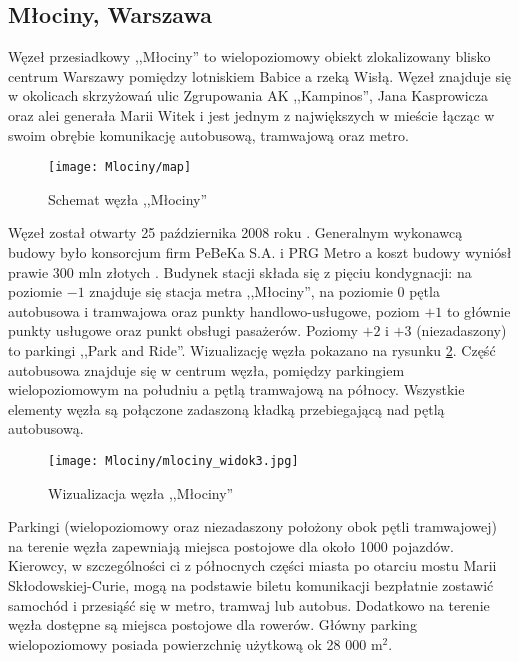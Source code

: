 \documentclass[twoside,12pt]{article}
\begin{document}
	\subsection{Młociny, Warszawa}
	
	Węzeł przesiadkowy ,,Młociny'' to wielopoziomowy obiekt zlokalizowany blisko centrum Warszawy pomiędzy lotniskiem Babice a rzeką Wisłą. Węzeł znajduje się w okolicach skrzyżowań ulic Zgrupowania AK ,,Kampinos'', Jana Kasprowicza oraz alei generała Marii Witek i jest jednym z największych w mieście łącząc w swoim obrębie komunikację autobusową, tramwajową oraz metro. 
	
	\begin{figure}[H]
		\centering
		\texttt{[image: Mlociny/map]}\\
		\caption{Schemat węzła ,,Młociny''}
		\label{mlociny1}
	\end{figure}	
	
	Węzeł został otwarty 25 października 2008 roku \cite{mlociny1}. Generalnym wykonawcą budowy było konsorcjum firm PeBeKa S.A. i PRG Metro a koszt budowy wyniósł prawie 300 mln złotych \cite{mlociny3}. Budynek stacji składa się z pięciu kondygnacji: na poziomie $-1$ znajduje się stacja metra ,,Młociny'', na poziomie $0$ pętla autobusowa i tramwajowa oraz punkty handlowo-usługowe, poziom $+1$ to głównie punkty usługowe oraz punkt obsługi pasażerów. Poziomy $+2$ i $+3$ (niezadaszony) to parkingi ,,Park and Ride''. Wizualizację węzła pokazano na rysunku \ref{mlociny2}. Część autobusowa znajduje się w centrum węzła, pomiędzy parkingiem wielopoziomowym na południu a pętlą tramwajową na północy. Wszystkie elementy węzła są połączone zadaszoną kładką przebiegającą nad pętlą autobusową.
	
	\begin{figure}[H]
		\centering
		\texttt{[image: Mlociny/mlociny\_widok3.jpg]}\\
		\caption{Wizualizacja węzła ,,Młociny''}
		\label{mlociny2}
	\end{figure}	
	
	Parkingi (wielopoziomowy oraz niezadaszony położony obok pętli tramwajowej) na terenie węzła zapewniają miejsca postojowe dla około 1000 pojazdów. Kierowcy, w szczególności ci z północnych części miasta po otarciu mostu Marii Skłodowskiej-Curie, mogą na podstawie biletu komunikacji bezpłatnie zostawić samochód i przesiąść się w metro, tramwaj lub autobus. Dodatkowo na terenie węzła dostępne są miejsca postojowe dla rowerów. Główny parking wielopoziomowy posiada powierzchnię użytkową ok 28 000 m$^2$. 
	
\end{document}
